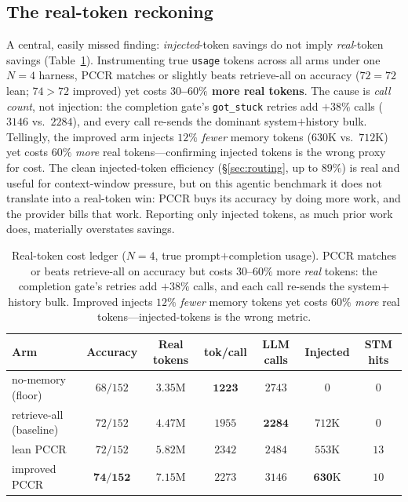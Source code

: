 \documentclass[10pt,twocolumn]{article}
\newcommand{\code}[1]{\texttt{\small #1}}
\begin{document}
\subsection{The real-token reckoning}\label{sec:realtoken}
A central, easily missed finding: \emph{injected}-token savings do not imply \emph{real}-token savings
(Table~\ref{tab:realtoken}). Instrumenting true \code{usage} tokens across all arms under one $N{=}4$
harness, PCCR matches or slightly beats retrieve-all on accuracy ($72{=}72$ lean; $74{>}72$ improved)
yet costs \textbf{$30$--$60\%$ more real tokens}. The cause is \emph{call count}, not injection: the
completion gate's \code{got\_stuck} retries add $+38\%$ calls ($3146$ vs.\ $2284$), and every call
re-sends the dominant system$+$history bulk. Tellingly, the improved arm injects $12\%$ \emph{fewer}
memory tokens ($630$K vs.\ $712$K) yet costs $60\%$ \emph{more} real tokens---confirming injected
tokens is the wrong proxy for cost. The clean injected-token efficiency (\S\ref{sec:routing}, up to
$89\%$) is real and useful for context-window pressure, but on this agentic benchmark it does not
translate into a real-token win: PCCR buys its accuracy by doing more work, and the provider bills
that work. Reporting only injected tokens, as much prior work does, materially overstates savings.

\begin{table}[t]
\centering\small
\setlength{\tabcolsep}{6pt}
\begin{tabular}{@{}lcccccc@{}}
\toprule
Arm & Accuracy & Real tokens & tok/call & LLM calls & Injected & STM hits \\
\midrule
no-memory (floor)        & $68/152$ & $\mathbf{3.35}$M & $\mathbf{1223}$ & $2743$ & $0$ & $0$ \\
retrieve-all (baseline)  & $72/152$ & $4.47$M & $1955$ & $\mathbf{2284}$ & $712$K & $0$ \\
lean PCCR                & $72/152$ & $5.82$M & $2342$ & $2484$ & $553$K & $13$ \\
improved PCCR            & $\mathbf{74/152}$ & $7.15$M & $2273$ & $3146$ & $\mathbf{630}$K & $10$ \\
\bottomrule
\end{tabular}
\caption{Real-token cost ledger ($N{=}4$, true prompt$+$completion usage). PCCR matches or beats
retrieve-all on accuracy but costs $30$--$60\%$ more \emph{real} tokens: the completion gate's retries
add $+38\%$ calls, and each call re-sends the system$+$history bulk. Improved injects $12\%$
\emph{fewer} memory tokens yet costs $60\%$ \emph{more} real tokens---injected-tokens is the wrong metric.}
\label{tab:realtoken}
\end{table}
\end{document}
